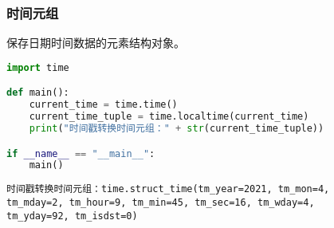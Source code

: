 \subsubsection{时间元组}

保存日期时间数据的元素结构对象。

\begin{table}[H]
	\centering
	\caption{时间元组}
\end{table}

\vspace{0.5cm}


\begin{lstlisting}[language=Python]
import time

def main():
    current_time = time.time()
    current_time_tuple = time.localtime(current_time)
    print("时间戳转换时间元组：" + str(current_time_tuple))

if __name__ == "__main__":
    main()
\end{lstlisting}

\begin{tcolorbox}
	\begin{verbatim}
时间戳转换时间元组：time.struct_time(tm_year=2021, tm_mon=4,
tm_mday=2, tm_hour=9, tm_min=45, tm_sec=16, tm_wday=4,
tm_yday=92, tm_isdst=0)
\end{verbatim}
\end{tcolorbox}

